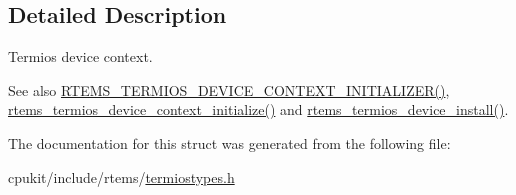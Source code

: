 \subsection{Detailed Description}
Termios device context. 

\begin{DoxySeeAlso}{See also}
\mbox{\hyperlink{termiostypes_8h_a2f61e75fe352067a33998556c23789a1}{R\+T\+E\+M\+S\+\_\+\+T\+E\+R\+M\+I\+O\+S\+\_\+\+D\+E\+V\+I\+C\+E\+\_\+\+C\+O\+N\+T\+E\+X\+T\+\_\+\+I\+N\+I\+T\+I\+A\+L\+I\+Z\+E\+R()}}, \mbox{\hyperlink{termiostypes_8h_a8ad7b82b22b5761f19a237d563342e1f}{rtems\+\_\+termios\+\_\+device\+\_\+context\+\_\+initialize()}} and \mbox{\hyperlink{termiostypes_8h_aede46864d5d763fd7591830fefe22e1c}{rtems\+\_\+termios\+\_\+device\+\_\+install()}}. 
\end{DoxySeeAlso}


The documentation for this struct was generated from the following file\+:\begin{DoxyCompactItemize}
\item 
cpukit/include/rtems/\mbox{\hyperlink{termiostypes_8h}{termiostypes.\+h}}\end{DoxyCompactItemize}

